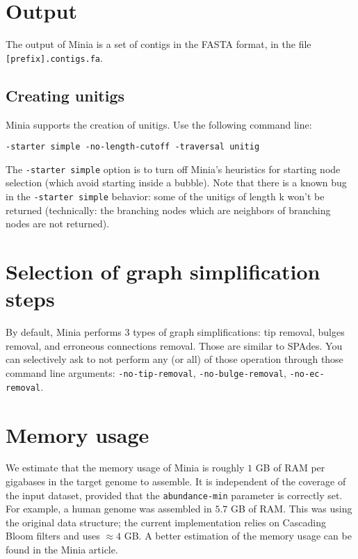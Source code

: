 \documentclass[a4paper]{article}
\begin{document}
\section{Output}

The output of Minia is a set of contigs in the FASTA format, in the file \verb+[prefix].contigs.fa+. 

\subsection*{Creating unitigs}

Minia supports the creation of unitigs. Use the following command line: 
\begin{verbatim}
-starter simple -no-length-cutoff -traversal unitig
\end{verbatim}

The \verb+-starter simple+ option is to turn off Minia's heuristics for starting node selection (which avoid starting inside a bubble).
Note that there is a known bug in the \verb+-starter simple+ behavior: some of the unitigs of length k won't be returned (technically: the branching nodes which are neighbors of branching nodes are not returned).

\section{Selection of graph simplification steps}

By default, Minia performs 3 types of graph simplifications: tip removal, bulges removal, and erroneous connections removal. Those are similar to SPAdes. You can selectively ask to not perform any (or all) of those operation through those command line arguments: \verb+-no-tip-removal+, \verb+-no-bulge-removal+, \verb+-no-ec-removal+.

\section{Memory usage}

We estimate that the memory usage of Minia is roughly $1$ GB of RAM per gigabases in the target genome to assemble. It is independent of the coverage of the input dataset, provided that the \verb!abundance-min! parameter is correctly set. For example, a human genome was assembled in $5.7$ GB of RAM. This was using the original data structure; the current implementation relies on Cascading Bloom filters and uses $\approx 4$ GB. A better estimation of the memory usage can be found in the Minia article.
\end{document}
